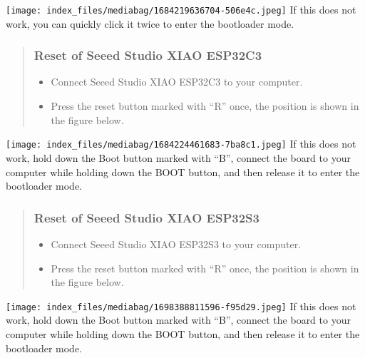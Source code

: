 \documentclass[
  letterpaper,
  DIV=11,
  numbers=noendperiod]{scrreprt}
\providecommand{\tightlist}{%
  \setlength{\itemsep}{0pt}\setlength{\parskip}{0pt}}\usepackage{longtable,booktabs,array}
\begin{document}
\texttt{[image: index\_files/mediabag/1684219636704-506e4c.jpeg]} If this
does not work, you can quickly click it twice to enter the bootloader
mode.

\begin{quote}
\hypertarget{reset-of-seeed-studio-xiao-esp32c3}{%
\subsubsection*{Reset of Seeed Studio XIAO
ESP32C3}\label{reset-of-seeed-studio-xiao-esp32c3}}

\begin{itemize}
\tightlist
\item
  Connect Seeed Studio XIAO ESP32C3 to your computer.
\item
  Press the reset button marked with ``R'' once, the position is shown
  in the figure below.
\end{itemize}
\end{quote}

\texttt{[image: index\_files/mediabag/1684224461683-7ba8c1.jpeg]} If this
does not work, hold down the Boot button marked with ``B'', connect the
board to your computer while holding down the BOOT button, and then
release it to enter the bootloader mode.

\begin{quote}
\hypertarget{reset-of-seeed-studio-xiao-esp32s3}{%
\subsubsection*{Reset of Seeed Studio XIAO
ESP32S3}\label{reset-of-seeed-studio-xiao-esp32s3}}

\begin{itemize}
\tightlist
\item
  Connect Seeed Studio XIAO ESP32S3 to your computer.
\item
  Press the reset button marked with ``R'' once, the position is shown
  in the figure below.
\end{itemize}
\end{quote}

\texttt{[image: index\_files/mediabag/1698388811596-f95d29.jpeg]} If this
does not work, hold down the Boot button marked with ``B'', connect the
board to your computer while holding down the BOOT button, and then
release it to enter the bootloader mode.
\end{document}
